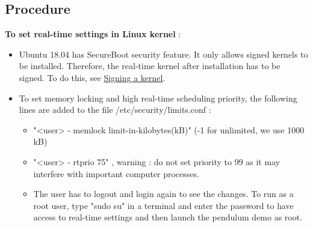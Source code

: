 \documentclass[%
xelatex,
	oneside,		%
	12pt,			%
	parskip=half,	%
	abstracton,
	chapterprefix=true%
    appendixprefix=true]
{scrbook}
\begin{document}
	\subsection{Procedure}	
\vspace*{0.5cm}
{\bfseries To set real-time settings in Linux kernel} :
\begin{itemize}
\item Ubuntu 18.04 has SecureBoot security feature. It only allows signed kernels to be installed. Therefore, the real-time kernel after installation has to be signed. To do this, see \href{https://askubuntu.com/questions/1081472/vmlinuz-4-18-12-041812-generic-has-invalid-signature}{Signing a kernel}.\cite{dualboot}
\item To set memory locking and high real-time scheduling priority, the following lines are added to the file /etc/security/limits.conf :
\begin{itemize}
\item "<user>  - memlock limit-in-kilobytes(kB)" (-1 for unlimited, we use 1000 kB)
\item "<user>  - rtprio 75" , warning : do not set priority to 99 as it may interfere with important computer processes.
\item The user has to logout and login again to see the changes. To run as a root user, type "sudo su" in a terminal and enter the password to have access to real-time settings and then launch the pendulum demo as root.
\end{itemize}
\end{itemize}
\end{document}
